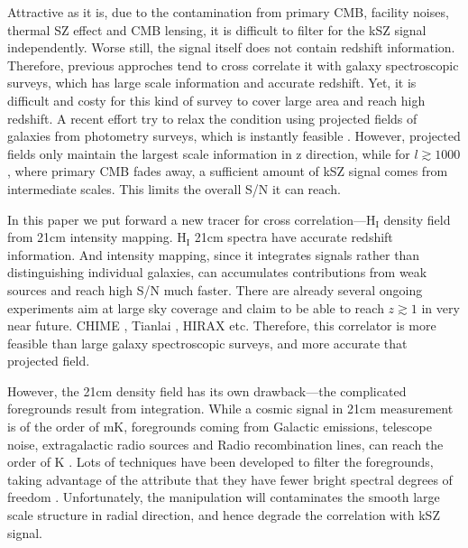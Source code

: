 Attractive as it is, 
due to the contamination from primary CMB, facility noises, 
thermal SZ effect and CMB lensing, 
it is difficult to filter for the kSZ signal independently. 
Worse still, the signal itself does not contain redshift information.
Therefore, previous approches tend to cross correlate it with 
galaxy spectroscopic surveys, 
which has large scale information and accurate redshift. 
Yet, it is difficult and costy for this kind of survey to cover large area 
and reach high redshift.  
A recent effort try to relax the condition using projected fields of galaxies 
from photometry surveys, which is instantly feasible \cite{Hill16}. 
However, projected fields only maintain the largest scale information in z direction, 
while for $l\gtrsim1000$, where primary CMB fades away, a sufficient amount of kSZ signal comes from intermediate scales. 
This limits the overall S/N it can reach.

In this paper we put forward a new tracer for cross correlation---$\mathrm{H_I}$ density field from 21cm intensity mapping. 
$\mathrm{H_I}$ 21cm spectra have accurate redshift information. 
And intensity mapping, since it 
integrates signals 
rather than distinguishing individual galaxies, 
can accumulates contributions from weak sources 
and reach high S/N much faster. 
There are already several ongoing experiments aim at large sky coverage and claim to be able to reach $z\gtrsim1$ in very near future.
CHIME \cite{2014SPIE.9145E..22B}, Tianlai \cite{2015ApJ...798...40X}, 
HIRAX \cite{HIRAX} etc.
Therefore, this correlator is more feasible than large galaxy spectroscopic surveys, 
and more accurate that projected field.

However, the 21cm density field has its own drawback---the complicated foregrounds result from integration. 
While a cosmic signal in 21cm measurement is of the order of mK,  
foregrounds coming from Galactic emissions, telescope noise, 
extragalactic radio sources and Radio recombination lines, 
can reach the order of K \cite{DiMatteo04,Masui13}. 
Lots of techniques have been developed to filter the foregrounds, 
taking advantage of the attribute that they have fewer bright spectral
degrees of freedom \cite{Switzer15}.
Unfortunately, the manipulation will contaminates the smooth large scale structure in radial direction, 
and hence degrade the correlation with kSZ signal.

